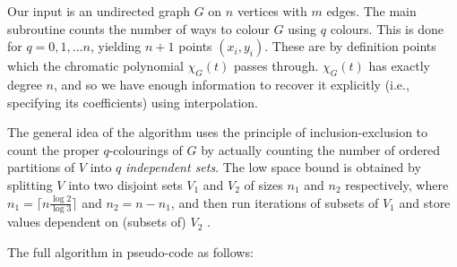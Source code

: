 \documentclass[a4paper]{article}
\begin{document}
Our input is an undirected graph $G$ on $n$ vertices with $m$ edges\footnotemark. The main subroutine counts the number of ways to colour $G$ using $q$ colours. This is done for $q = 0, 1, \ldots n$, yielding $n + 1$ points $(x_i, y_i)$. These are by definition points which the chromatic polynomial $\chi_G(t)$ passes through. $\chi_G(t)$ has exactly degree $n$, and so we have enough information to recover it explicitly (i.e., specifying its coefficients) using interpolation.

The general idea of the algorithm uses the principle of inclusion-exclusion to count the proper $q$-colourings of $G$ by actually counting the number of ordered partitions of $V$ into $q$ \emph{independent sets}. The low space bound is obtained by splitting $V$ into two disjoint sets $V_1$ and $V_2$ of sizes $n_1$ and $n_2$ respectively, where $n_1 = \lceil n \frac{\log2}{\log3} \rceil$ and $n_2 = n - n_1$, and then run iterations of subsets of $V_1$ and store values dependent on (subsets of) $V_2$ \cite[sec. 5]{cov_pack}. 


The full algorithm in pseudo-code as follows:
\end{document}
